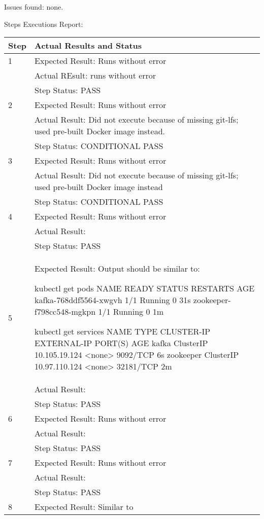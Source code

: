 \documentclass[DM,lsstdraft,STR,toc]{lsstdoc}
\begin{document}
Issues found: none.

Steps Executions Report:

\begin{longtable}{p{2cm}p{14cm}}
\hline
{Step} & {Actual Results and Status}\\ \hline
1 & Expected Result: Runs without error \\\cline{2-2}
  & Actual REsult: runs without error \\\cline{2-2}
  & Step Status: PASS \\\hline
2 & Expected Result: Runs without error \\\cline{2-2}
  & Actual Result: Did not execute because of missing git-lfs; used pre-built Docker image instead. \\\cline{2-2}
  & Step Status: CONDITIONAL PASS \\\hline
3 & Expected Result: Runs without error \\\cline{2-2}
  & Actual Result: Did not execute because of missing git-lfs; used pre-built Docker image instead \\\cline{2-2}
  & Step Status: CONDITIONAL PASS \\\hline
4 & Expected Result: Runs without error \\\cline{2-2}
  & Actual Result: \\\cline{2-2}
  & Step Status: PASS \\\hline
5 & Expected Result: Output should be similar to:

kubectl get pods
NAME                        READY     STATUS    RESTARTS   AGE
kafka-768ddf5564-xwgvh      1/1       Running   0          31s
zookeeper-f798cc548-mgkpn   1/1       Running   0          1m

kubectl get services
NAME        TYPE        CLUSTER-IP      EXTERNAL-IP   PORT(S)     AGE
kafka       ClusterIP   10.105.19.124   <none>        9092/TCP    6s
zookeeper   ClusterIP   10.97.110.124   <none>        32181/TCP   2m
\\\cline{2-2}
  & Actual Result: \\\cline{2-2}
  & Step Status: PASS \\\hline
6 & Expected Result: Runs without error \\\cline{2-2}
  & Actual Result: \\\cline{2-2}
  & Step Status: PASS \\\hline
7 & Expected Result: Runs without error \\\cline{2-2}
  & Actual Result: \\\cline{2-2}
  & Step Status: PASS \\\hline
8 & Expected Result: Similar to


\end{longtable}
\end{document}
